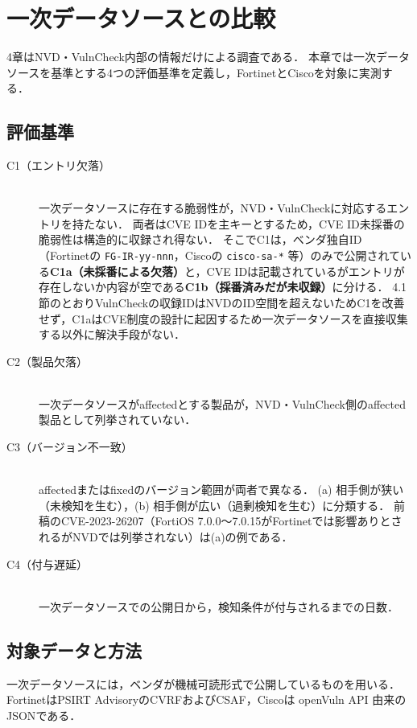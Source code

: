 \section{一次データソースとの比較}

4章はNVD・VulnCheck内部の情報だけによる調査である．
本章では一次データソースを基準とする4つの評価基準を定義し，FortinetとCiscoを対象に実測する．

\subsection{評価基準}

\begin{description}
  \item[C1（エントリ欠落）] \mbox{} \\
    一次データソースに存在する脆弱性が，NVD・VulnCheckに対応するエントリを持たない．
    両者はCVE IDを主キーとするため，CVE ID未採番の脆弱性は構造的に収録され得ない．
    そこでC1は，ベンダ独自ID（Fortinetの \texttt{FG-IR-yy-nnn}，Ciscoの \texttt{cisco-sa-*} 等）のみで公開されている\textbf{C1a（未採番による欠落）}と，CVE IDは記載されているがエントリが存在しないか内容が空である\textbf{C1b（採番済みだが未収録）}に分ける．
    4.1節のとおりVulnCheckの収録IDはNVDのID空間を超えないためC1を改善せず，C1aはCVE制度の設計に起因するため一次データソースを直接収集する以外に解決手段がない．
  \item[C2（製品欠落）] \mbox{} \\
    一次データソースがaffectedとする製品が，NVD・VulnCheck側のaffected製品として列挙されていない．
  \item[C3（バージョン不一致）] \mbox{} \\
    affectedまたはfixedのバージョン範囲が両者で異なる．
    (a) 相手側が狭い（未検知を生む），(b) 相手側が広い（過剰検知を生む）に分類する．
    前稿\cite{nakaoka2025}のCVE-2023-26207（FortiOS 7.0.0〜7.0.15がFortinetでは影響ありとされるがNVDでは列挙されない）は(a)の例である．
  \item[C4（付与遅延）] \mbox{} \\
    一次データソースでの公開日から，検知条件が付与されるまでの日数．
\end{description}

\subsection{対象データと方法}

一次データソースには，ベンダが機械可読形式で公開しているものを用いる．
FortinetはPSIRT AdvisoryのCVRFおよびCSAF\cite{vuls-data-raw-fortinet-cvrf,vuls-data-raw-fortinet-csaf}，Ciscoは openVuln API 由来のJSON\cite{vuls-data-raw-cisco-json}である．

